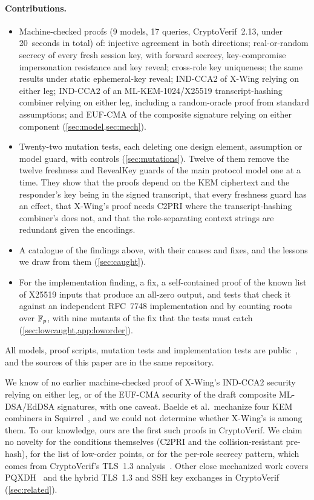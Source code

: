 \paragraph{Contributions.}
\begin{itemize}
  \item Machine-checked proofs (9 models, 17 queries, CryptoVerif~2.13, under
  20~seconds in total) of: injective agreement in both directions;
  real-or-random secrecy of every fresh session key, with forward secrecy,
  key-compromise impersonation resistance and key reveal; cross-role key
  uniqueness; the same results under static ephemeral-key reveal; IND-CCA2 of
  X-Wing relying on either leg; IND-CCA2 of an ML-KEM-1024/X25519
  transcript-hashing combiner relying on either leg, including a
  random-oracle proof from standard assumptions; and EUF-CMA of the composite
  signature relying on either component (\cref{sec:model,sec:mech}).
  \item Twenty-two mutation tests, each deleting one design element,
  assumption or model guard, with controls (\cref{sec:mutations}). Twelve of
  them remove the twelve freshness and RevealKey guards of the main protocol
  model one at a time. They show that the proofs depend on the KEM
  ciphertext and the responder's key being in the signed transcript, that
  every freshness guard has an effect, that X-Wing's proof needs C2PRI where
  the transcript-hashing combiner's does not, and that the role-separating
  context strings are redundant given the encodings.
  \item A catalogue of the findings above, with their causes and fixes, and
  the lessons we draw from them (\cref{sec:caught}).
  \item For the implementation finding, a fix, a self-contained proof of the
  known list of X25519 inputs that produce an all-zero output, and tests
  that check it against an independent RFC~7748 implementation and by
  counting roots over $\mathbb{F}_p$, with nine mutants of the fix that the tests must
  catch (\cref{sec:lowcaught,app:loworder}).
\end{itemize}
All models, proof scripts, mutation tests and implementation
tests are public~\cite{Artifact}, and the sources of this paper are in the
same repository.

We know of no earlier machine-checked proof of X-Wing's IND-CCA2 security
relying on either leg, or of the EUF-CMA security of the draft composite
ML-DSA/EdDSA signatures, with one caveat. Baelde et al.\ mechanize four KEM
combiners in Squirrel~\cite{BDDJK26}, and we could not determine whether
X-Wing's is among them. To our knowledge, ours are the first such proofs in
CryptoVerif. We claim no novelty for the conditions themselves (C2PRI and
the collision-resistant pre-hash), for the list of low-order points, or for
the per-role secrecy pattern, which comes from CryptoVerif's TLS~1.3
analysis~\cite{BBK17}. Other close mechanized work covers PQXDH~\cite{BJKS24}
and the hybrid TLS~1.3 and SSH key exchanges in CryptoVerif~\cite{BJ24}
(\cref{sec:related}).

